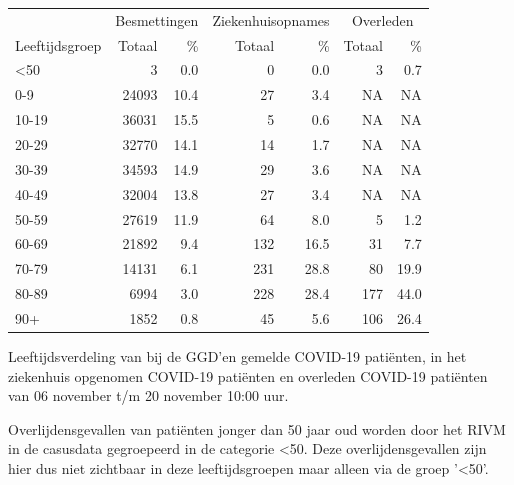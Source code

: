 \documentclass[
  english,
  man,floatsintext]{apa6}
\begin{document}
\begin{table}
\centering\begingroup\fontsize{11}{13}\selectfont

\begin{threeparttable}
\begin{tabular}{lrrrrrr}
\toprule
\multicolumn{1}{c}{ } & \multicolumn{2}{c}{Besmettingen} & \multicolumn{2}{c}{Ziekenhuisopnames} & \multicolumn{2}{c}{Overleden} \\
\cmidrule(l{3pt}r{3pt}){2-3} \cmidrule(l{3pt}r{3pt}){4-5} \cmidrule(l{3pt}r{3pt}){6-7}
Leeftijdsgroep & Totaal & \% & Totaal & \% & Totaal & \%\\
\midrule
<50 & 3 & 0.0 & 0 & 0.0 & 3 & 0.7\\
0-9 & 24093 & 10.4 & 27 & 3.4 & NA & NA\\
10-19 & 36031 & 15.5 & 5 & 0.6 & NA & NA\\
20-29 & 32770 & 14.1 & 14 & 1.7 & NA & NA\\
30-39 & 34593 & 14.9 & 29 & 3.6 & NA & NA\\
40-49 & 32004 & 13.8 & 27 & 3.4 & NA & NA\\
50-59 & 27619 & 11.9 & 64 & 8.0 & 5 & 1.2\\
60-69 & 21892 & 9.4 & 132 & 16.5 & 31 & 7.7\\
70-79 & 14131 & 6.1 & 231 & 28.8 & 80 & 19.9\\
80-89 & 6994 & 3.0 & 228 & 28.4 & 177 & 44.0\\
90+ & 1852 & 0.8 & 45 & 5.6 & 106 & 26.4\\
\bottomrule
\end{tabular}
\begin{tablenotes}
\item[1] Leeftijdsverdeling van bij de GGD’en gemelde COVID-19 patiënten, in het ziekenhuis opgenomen COVID-19 patiënten en overleden COVID-19 patiënten van 06 november t/m 20 november 10:00 uur.
\item[2] Overlijdensgevallen van patiënten jonger dan 50 jaar oud worden door het RIVM in de casusdata gegroepeerd in de categorie <50. Deze overlijdensgevallen zijn hier dus niet zichtbaar in deze leeftijdsgroepen maar alleen via de groep '<50'.
\end{tablenotes}
\end{threeparttable}
\endgroup{}
\end{table}

\newpage
\end{document}
